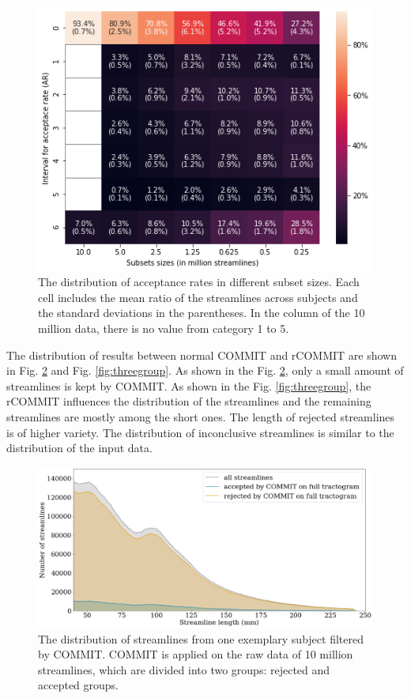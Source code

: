 \begin{figure}[ht]
    \centering
    \includegraphics[width= 13cm]{figures/heatmap.png}
        \caption{The distribution of acceptance rates in different subset sizes. Each cell includes the mean ratio of 
        the streamlines across subjects and the standard deviations in the parentheses. In the column of the 10 million data, there is no value from category 1 to 5.
        }
    \label{fig:heatmap}
\end{figure}

The distribution of results between normal COMMIT and rCOMMIT are shown in Fig. \ref{fig:ori_distri} and Fig. \ref{fig:threegroup}.
As shown in the Fig. \ref{fig:ori_distri}, only a small amount of streamlines is kept by COMMIT. As shown in the Fig. \ref{fig:threegroup}, the rCOMMIT influences the distribution of the streamlines and the remaining 
streamlines are mostly among the short ones. The length of rejected streamlines is of higher variety. The distribution of inconclusive streamlines
is similar to the distribution of the input data.

\begin{figure}[ht]
    \centering
    \includegraphics[width= 15cm]{figures/distributon_origi.png}
        \caption{The distribution of streamlines from one exemplary subject filtered by COMMIT. COMMIT is applied on the raw data of 10 million streamlines, which are 
        divided into two groups: rejected and accepted groups.}
    \label{fig:ori_distri}
\end{figure}

